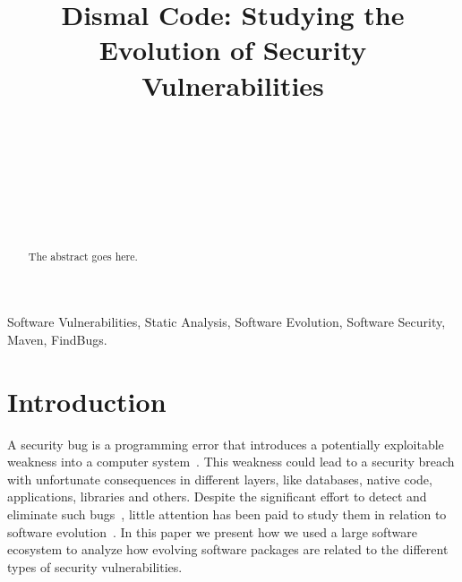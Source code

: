 \documentclass[conference]{IEEEtran}
\begin{document}
\title{Dismal Code: Studying the Evolution of Security Vulnerabilities}

\author{
\\
\and
{}
\\
\and
{}
\\
\and
{}
\\
\and
{}
}

\maketitle

\begin{abstract}
The abstract goes here.
\end{abstract}

\begin{IEEEkeywords}
Software Vulnerabilities, Static Analysis, Software Evolution, Software
Security, Maven, FindBugs.
\end{IEEEkeywords}

\IEEEpeerreviewmaketitle

\section{Introduction}

A security bug is a programming error that introduces a potentially
exploitable weakness into a computer system~\cite{SSL12}. This weakness could lead to a
security breach with unfortunate consequences in different layers, like databases,
native code, applications, libraries and others. Despite the significant
effort to detect and eliminate such bugs~\cite{SZ12}, little attention has been paid to
study them in relation to software evolution~\cite{L96, LRWPT97, IB06}. In this paper we present how we
used a large software ecosystem to analyze how evolving software packages are
related to the different types of security vulnerabilities.
\end{document}
